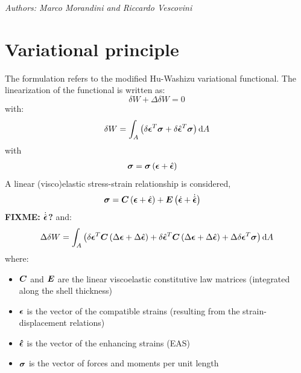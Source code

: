 \emph{Authors: Marco Morandini and Riccardo Vescovini}
\newcommand{ \fracd }[ 2 ]{ \frac{ \displaystyle{ #1 } }{ \displaystyle{ #2 }} }
\newcommand{ \fracdp }[ 2 ]{ \frac{ \displaystyle{ \partial #1 } }{ \displaystyle{ \partial #2 }} }
\newcommand{ \Rot }[ 1 ]{ \texttt{Rot} \plbr{ #1 } }
\newcommand{ \VecRot }[ 1 ]{ \texttt{VecRot} \plbr{ #1 } }
\newcommand{ \valxii }[ 0 ]{\plbr{ \T{ \xi }_{ i } } }
\newcommand{ \valxin }[ 0 ]{\plbr{ \T{ \xi }_{ n } } }
\newcommand{ \valxiA }[ 0 ]{\plbr{ \T{ \xi }_{ A } } }
\newcommand{ \valxio }[ 0 ]{\plbr{ \T{ \xi }_{ 0 } } }
\noindent


\section{Variational principle}
The formulation refers to the modified Hu-Washizu variational functional. The linearization of the functional is written as:
\begin{equation}
\delta W + \Delta \delta W = 0
\end{equation}
with:
\begin{equation}
\delta W = \int_A \left( 
\delta{\bm{\epsilon}}^T \bm{\sigma} + \delta \hat{\bm{\epsilon}}^T \bm{\sigma}
 \right) \text{d}A
\label{eq:deltaW}
\end{equation}
with
\begin{align}
	\bm{\sigma} &= \bm{\sigma}\left( \bm{\epsilon} + \hat{\bm{\epsilon}} \right)
\end{align}
A linear (visco)elastic stress-strain relationship is considered,
\begin{align}
	\bm{\sigma}
	&=
	\bm{C} \left( 
		\bm{\epsilon} + \hat{\bm{\epsilon}}
	 \right)
	+
	\bm{E} \left( 
		\dot{\bm{\epsilon}} + \dot{\hat{\bm{\epsilon}}}
	 \right)
\end{align}
\textbf{FIXME: $\dot{\hat{\bm{\epsilon}}}$?}
and:
\begin{equation}
\Delta \delta W = \int_A \left( 
\delta {\bm{\epsilon}} ^T  \bm{C} \left(  \Delta {\bm{\epsilon}}  + \Delta \hat{\bm{\epsilon}} \right) +
\delta \hat{\bm{\epsilon}} ^T  \bm{C} \left(  \Delta {\bm{\epsilon}}  + \Delta \hat{\bm{\epsilon}} \right) +
\Delta \delta { \bm{\epsilon} }^T \bm{\sigma}
 \right) \text{d}A
\label{eq:DeltadeltaW}
\end{equation}
where:
\begin{itemize}
\item $\bm{C}$ and $\bm{E}$ are the linear viscoelastic constitutive law matrices (integrated along the shell thickness)
\item $\bm{\epsilon}$ is the vector of the compatible strains (resulting from the strain-displacement relations)
\item $\bm{\hat{\epsilon}}$ is the vector of the enhancing strains (EAS)
\item $\bm{\sigma}$ is the vector of forces and moments per unit length
\end{itemize}
